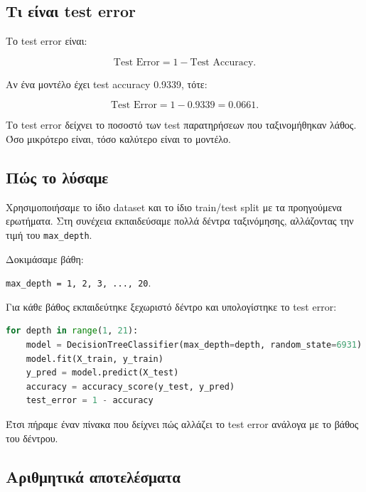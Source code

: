\documentclass[12pt,a4paper]{article}
\newcommand{\code}[1]{\texttt{\textenglish{#1}}}
\begin{document}
\subsection{Τι είναι test error}

Το test error είναι:

\[
    \text{Test Error} = 1 - \text{Test Accuracy}.
\]

Αν ένα μοντέλο έχει test accuracy 0.9339, τότε:

\[
    \text{Test Error} = 1 - 0.9339 = 0.0661.
\]

Το test error δείχνει το ποσοστό των test παρατηρήσεων που ταξινομήθηκαν
λάθος. Όσο μικρότερο είναι, τόσο καλύτερο είναι το μοντέλο.

\subsection{Πώς το λύσαμε}

Χρησιμοποιήσαμε το ίδιο dataset και το ίδιο train/test split με τα προηγούμενα
ερωτήματα. Στη συνέχεια εκπαιδεύσαμε πολλά δέντρα ταξινόμησης, αλλάζοντας την
τιμή του \code{max\_depth}.

Δοκιμάσαμε βάθη:

\begin{center}
\code{max\_depth = 1, 2, 3, ..., 20}.
\end{center}

Για κάθε βάθος εκπαιδεύτηκε ξεχωριστό δέντρο και υπολογίστηκε το test error:

\begin{lstlisting}[language=Python]
for depth in range(1, 21):
    model = DecisionTreeClassifier(max_depth=depth, random_state=6931)
    model.fit(X_train, y_train)
    y_pred = model.predict(X_test)
    accuracy = accuracy_score(y_test, y_pred)
    test_error = 1 - accuracy
\end{lstlisting}

Έτσι πήραμε έναν πίνακα που δείχνει πώς αλλάζει το test error ανάλογα με το
βάθος του δέντρου.

\subsection{Αριθμητικά αποτελέσματα}
\end{document}
